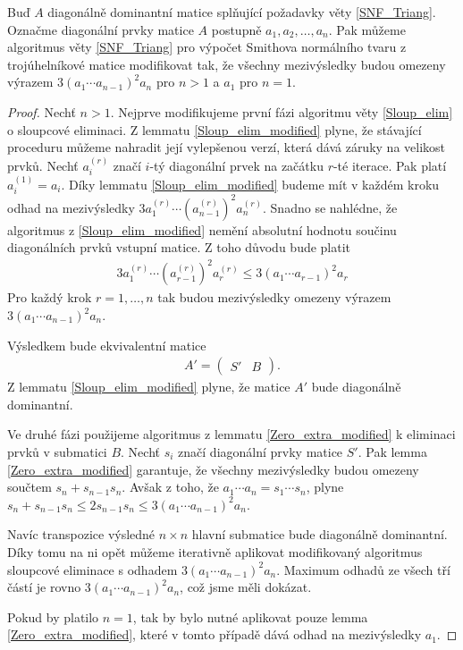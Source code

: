 \begin{vet} \label{SNF_Triang_modified}
Buď $ A $ diagonálně dominantní matice splňující požadavky věty \ref{SNF_Triang}.
Označme diagonální prvky matice $ A $ postupně $ a_1, a_2, \dots, a_n $.
Pak můžeme algoritmus věty \ref{SNF_Triang} pro výpočet Smithova normálního 
tvaru z trojúhelníkové matice modifikovat tak, že všechny mezivýsledky budou 
omezeny výrazem $ 3 (a_1 \cdots a_{n - 1})^2 a_n $ pro $ n > 1 $ a $ a_1 $ 
pro $ n = 1 $.
\end{vet}
\begin{proof}
Nechť $ n > 1 $.
Nejprve modifikujeme první fázi algoritmu věty \ref{Sloup_elim} o sloupcové 
eliminaci. Z lemmatu \ref{Sloup_elim_modified} plyne, že stávající proceduru 
můžeme nahradit její vylepšenou verzí, která dává záruky na velikost prvků. 
Nechť $ a_i^{(r)} $ značí $ i $-tý diagonální prvek na začátku $ r $-té 
iterace. Pak platí $ a_i^{(1)} = a_i $. Díky lemmatu \ref{Sloup_elim_modified}
budeme mít v každém kroku odhad na mezivýsledky 
$ 3 a_1^{(r)} \cdots (a_{n - 1}^{(r)})^2 a_n^{(r)} $.
Snadno se nahlédne, že algoritmus z \ref{Sloup_elim_modified} nemění absolutní 
hodnotu součinu diagonálních prvků vstupní matice. Z toho důvodu bude platit
\begin{align*}
    3 a_1^{(r)} \cdots (a_{r - 1}^{(r)})^2 a_r^{(r)}
        \leq 3 (a_1 \cdots a_{r - 1})^2 a_r
\end{align*}
Pro každý krok $ r = 1, \dots, n $ tak budou mezivýsledky omezeny výrazem
$ 3 (a_1 \cdots a_{n - 1})^2 a_n $.

Výsledkem bude ekvivalentní matice
\begin{align*}
A' =
    \left(
    \begin{array}{c|c}
        S' & B
    \end{array}
    \right)
.
\end{align*}
Z lemmatu \ref{Sloup_elim_modified} plyne, že matice $ A' $ bude diagonálně
dominantní.

Ve druhé fázi použijeme algoritmus z lemmatu \ref{Zero_extra_modified}
k eliminaci prvků v submatici $ B $. Nechť $ s_i $ značí diagonální prvky matice 
$ S' $. Pak lemma \ref{Zero_extra_modified} garantuje, že všechny mezivýsledky 
budou omezeny součtem $ s_n + s_{n - 1} s_n $. Avšak z toho, že 
$ a_1 \cdots a_n = s_1 \cdots s_n $, plyne 
$ s_n + s_{n - 1} s_n \leq 2 s_{n - 1} s_n \leq 3 (a_1 \cdots a_{n - 1})^2 a_n $.

Navíc transpozice výsledné $ n \times n $ hlavní submatice bude diagonálně 
dominantní. Díky tomu na ni opět můžeme iterativně aplikovat modifikovaný 
algoritmus sloupcové eliminace s odhadem $ 3 (a_1 \cdots a_{n - 1})^2 a_n $.
Maximum odhadů ze všech tří částí je rovno $ 3 (a_1 \cdots a_{n - 1})^2 a_n $, 
což jsme měli dokázat.

Pokud by platilo $ n = 1 $, tak by bylo nutné aplikovat pouze lemma 
\ref{Zero_extra_modified}, které v tomto případě dává odhad na mezivýsledky
$ a_1 $.
\end{proof}






